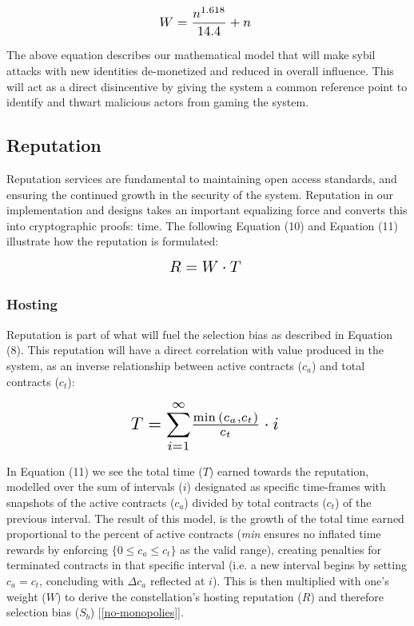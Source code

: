 \documentclass[11pt]{article}
\begin{document}
\begin{equation}
    \resizebox{.25\hsize}{!}{$W = \mathlarger{\frac{n^{1.618}}{14.4}} + n$ }
\end{equation}

\bigskip
\noindent The above equation describes our mathematical model that will make sybil attacks with new identities de-monetized and reduced in overall influence.
This will act as a direct disincentive by giving the system a common reference point to identify and thwart malicious actors from gaming the system.



\subsection{Reputation}

Reputation services are fundamental to maintaining open access standards, and ensuring the continued growth in the security of the system.
Reputation in our implementation and designs takes an important equalizing force and converts this into cryptographic proofs: time. 
The following Equation (10) and Equation (11) illustrate how the reputation is formulated:

\begin{equation}
    \resizebox{.2\hsize}{!}{$R = W \cdot T$ }
\end{equation}

\subsubsection{Hosting}

Reputation is part of what will fuel the selection bias as described in Equation (8).
This reputation will have a direct correlation with value produced in the system, as an inverse relationship between active contracts ($c_a$) and total contracts ($c_t$):

\begin{equation}
    \resizebox{.4\hsize}{!}{$T = \mathlarger{\sum}_{i=1}^{\infty} \frac{\min{(c_a, c_t)}}{c_t} \cdot i$ }
\end{equation}

\bigskip
\noindent In Equation (11) we see the total time ($T$) earned towards the reputation, modelled over the sum of intervals ($i$) designated as specific time-frames with snapshots of the active contracts ($c_a$) divided by total contracts ($c_t$) of the previous interval.
The result of this model, is the growth of the total time earned proportional to the percent of active contracts (\textit{min} ensures no inflated time rewards by enforcing $\{0 \leq c_a \leq c_t\}$ as the valid range), creating penalties for terminated contracts in that specific interval (i.e. a new interval begins by setting $c_a = c_t$, concluding with $\Delta c_a$ reflected at $i$).
This is then multiplied with one's weight ($W$) to derive the constellation's hosting reputation ($R$) and therefore selection bias ($S_b$) [\ref{no-monopolies}].
\end{document}
